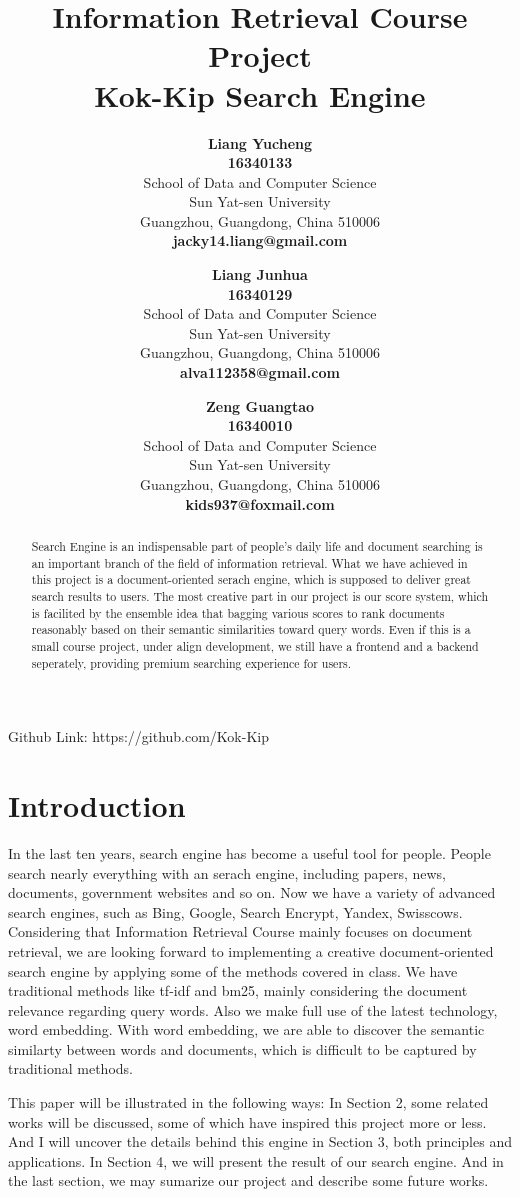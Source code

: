 \documentclass[UTF8]{article}
\title{Information Retrieval Course Project \\
	Kok-Kip Search Engine}
\author{
	\textbf{Liang Yucheng} \\
	\textbf{16340133} \\
	School of Data and Computer Science\\
	Sun Yat-sen University\\
	Guangzhou, Guangdong, China 510006 \\
	\textbf{jacky14.liang@gmail.com} \\
	\and
	\textbf{Liang Junhua} \\
	\textbf{16340129} \\
	School of Data and Computer Science\\
	Sun Yat-sen University\\
	Guangzhou, Guangdong, China 510006 \\
	\textbf{alva112358@gmail.com} \\
	\and
	\textbf{Zeng Guangtao} \\
	\textbf{16340010} \\
	School of Data and Computer Science\\
	Sun Yat-sen University\\
	Guangzhou, Guangdong, China 510006 \\
	\textbf{kids937@foxmail.com} \\
}
\begin{document}
	\maketitle
	
	\begin{abstract}
		Search Engine is an indispensable part of people's daily life and document searching is an important branch of the field of information retrieval. What we have achieved in this project is a document-oriented serach engine, which is supposed to deliver great search results to users. The most creative part in our project is our score system, which is facilited by the ensemble idea that bagging various scores to rank documents reasonably based on their semantic similarities toward query words. Even if this is a small course project, under align development, we still have a frontend and a backend seperately, providing premium searching experience for users.
	\end{abstract}
	
	
	
	
	Github Link: https://github.com/Kok-Kip
	
	
	\section{Introduction}
	In the last ten years, search engine has become a useful tool for people. People search nearly everything with an serach engine, including papers, news, documents, government websites and so on. Now we have a variety of advanced search engines, such as Bing, Google, Search Encrypt, Yandex, Swisscows. Considering that Information Retrieval Course mainly focuses on document retrieval, we are looking forward to implementing a creative document-oriented search engine by applying some of the methods covered in class. We have traditional methods like tf-idf and bm25, mainly considering the document relevance regarding query words. Also we make full use of the latest technology, word embedding. With word embedding, we are able to discover the semantic similarty between words and documents, which is difficult to be captured by traditional methods.
	
	This paper will be illustrated in the following ways: In Section 2, some related works will be discussed, some of which have inspired this project more or less. And I will uncover the details behind this engine in Section 3, both principles and applications. In Section 4, we will present the result of our search engine. And in the last section, we may sumarize our project and describe some future works.
	
\end{document}
